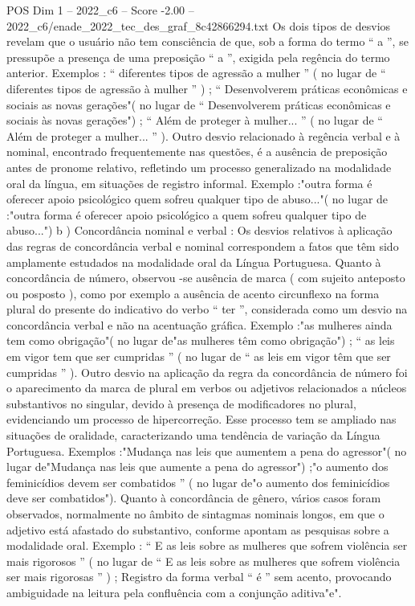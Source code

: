 \begin{textsample}{POS Dim 1 – 2022\_c6 – Score -2.00 – 2022\_c6/enade\_2022\_tec\_des\_graf\_8c42866294.txt}
Os dois tipos de desvios revelam que o usuário não tem consciência de que, sob a forma do termo “ a ”, se pressupõe a presença de uma preposição “ a ”, exigida pela regência do termo anterior.
Exemplos : “ diferentes tipos de agressão a mulher ” ( no lugar de “ diferentes tipos de agressão à mulher ” ) ; “ Desenvolverem práticas econômicas e sociais as novas gerações"( no lugar de “ Desenvolverem práticas econômicas e sociais às novas gerações") ; “ Além de proteger à mulher... ” ( no lugar de “ Além de proteger a mulher... ” ).
Outro desvio relacionado à regência verbal e à nominal, encontrado frequentemente nas questões, é a ausência de preposição antes de pronome relativo, refletindo um processo generalizado na modalidade oral da língua, em situações de registro informal.
Exemplo :"outra forma é oferecer apoio psicológico quem sofreu qualquer tipo de abuso..."( no lugar de :"outra forma é oferecer apoio psicológico a quem sofreu qualquer tipo de abuso...") b ) Concordância nominal e verbal : Os desvios relativos à aplicação das regras de concordância verbal e nominal correspondem a fatos que têm sido amplamente estudados na modalidade oral da Língua Portuguesa.
Quanto à concordância de número, observou -se ausência de marca ( com sujeito anteposto ou posposto ), como por exemplo a ausência de acento circunflexo na forma plural do presente do indicativo do verbo “ ter ”, considerada como um desvio na concordância verbal e não na acentuação gráfica.
Exemplo :"as mulheres ainda tem como obrigação"( no lugar de"as mulheres têm como obrigação") ; “ as leis em vigor tem que ser cumpridas ” ( no lugar de “ as leis em vigor têm que ser cumpridas ” ).
Outro desvio na aplicação da regra da concordância de número foi o aparecimento da marca de plural em verbos ou adjetivos relacionados a núcleos substantivos no singular, devido à presença de modificadores no plural, evidenciando um processo de hipercorreção.
Esse processo tem se ampliado nas situações de oralidade, caracterizando uma tendência de variação da Língua Portuguesa.
Exemplos :"Mudança nas leis que aumentem a pena do agressor"( no lugar de"Mudança nas leis que aumente a pena do agressor") ;"o aumento dos feminicídios devem ser combatidos ” ( no lugar de"o aumento dos feminicídios deve ser combatidos").
Quanto à concordância de gênero, vários casos foram observados, normalmente no âmbito de sintagmas nominais longos, em que o adjetivo está afastado do substantivo, conforme apontam as pesquisas sobre a modalidade oral.
Exemplo : “ E as leis sobre as mulheres que sofrem violência ser mais rigorosos ” ( no lugar de “ E as leis sobre as mulheres que sofrem violência ser mais rigorosas ” ) ; Registro da forma verbal “ é ” sem acento, provocando ambiguidade na leitura pela confluência com a conjunção aditiva"e".

\end{textsample}
